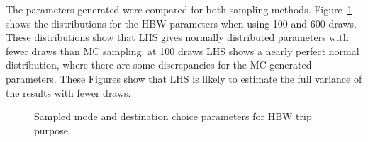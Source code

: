 \documentclass[
  letterpaper,
]{trb}
\begin{document}
The parameters generated were compared for both sampling methods.
Figure~\ref{fig-parameter} shows the distributions for the HBW
parameters when using 100 and 600 draws. These distributions show that
LHS gives normally distributed parameters with fewer draws than MC
sampling: at 100 draws LHS shows a nearly perfect normal distribution,
where there are some discrepancies for the MC generated parameters.
These Figures show that LHS is likely to estimate the full variance of
the results with fewer draws.

\begin{figure}

\begin{minipage}[t]{0.50\linewidth}

{\centering 


}

\end{minipage}%
%
\begin{minipage}[t]{0.50\linewidth}

{\centering 


}

\end{minipage}%

\caption{\label{fig-parameter}Sampled mode and destination choice
parameters for HBW trip purpose.}

\end{figure}
\end{document}
